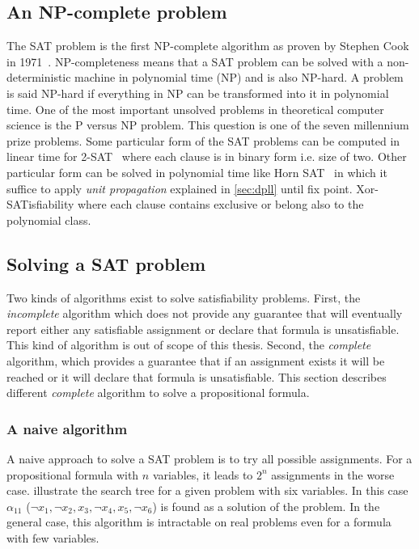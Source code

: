 \subsection{An NP-complete problem}
The SAT problem is the first NP-complete algorithm as proven by Stephen Cook in 1971~\cite{cook1971complexity}.
NP-completeness means that a SAT problem can be solved with a non-deterministic machine in polynomial time (NP) and is also NP-hard. A problem is said NP-hard if everything in NP can be transformed into it in polynomial time. 
One of the most important unsolved problems in theoretical computer science is the P versus NP problem.
This question is one of the seven millennium prize problems.
Some particular form of the SAT problems can be computed in linear time for 2-SAT~\cite{aspvall1979linear}
where each clause is in binary form i.e. size  of two. %
Other particular form  can be solved in  polynomial time like Horn SAT~\cite{aspvall1979linear} in which it suffice to  apply \emph{unit propagation} explained in \cref{sec:dpll} until fix point.
Xor-SATisfiability where each clause contains exclusive or belong also to the polynomial class.
%
%

\subsection{Solving a SAT problem}
Two kinds of algorithms exist to solve satisfiability problems.
First, the \emph{incomplete} algorithm which does not provide any guarantee that will eventually report either any satisfiable assignment or declare that formula is unsatisfiable. This kind of algorithm is out of scope of this thesis. 
Second, the \emph{complete} algorithm, which provides a guarantee that if an assignment exists
it will be reached or it will declare that formula is unsatisfiable.
This section describes different \emph{complete }algorithm to solve a propositional formula.

\subsubsection{A naive algorithm}
A naive approach to solve a SAT problem is to try all possible assignments.
For a propositional formula with $n$ variables, it leads to $2^n$ assignments in the worse case.  
 illustrate the search tree for a given problem with six variables.
In this case $\alpha_{11}$ ($\neg x_1, \neg x_2, x_3, \neg x_4, x_5, \neg x_6 $) is found as a solution of the problem. In the general case,
this algorithm is  intractable on real problems even for a formula with few variables.

